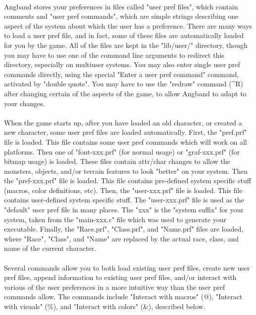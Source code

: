 \paragraph{}Angband stores your preferences in files called "user pref files",
which contain comments and "user pref commands", which are simple strings
describing one aspect of the system about which the user has a preference.
There are many ways to load a user pref file, and in fact, some of these
files are automatically loaded for you by the game. All of the files are
kept in the "lib/user/" directory, though you may have to use one of the
command line arguments to redirect this directory, especially on multiuser
systems. You may also enter single user pref commands directly, using the
special "Enter a user pref command" command, activated by "double quote".
You may have to use the "redraw" command (\^{}R) after changing certain of
the aspects of the game, to allow Angband to adapt to your changes.

\paragraph{}When the game starts up, after you have loaded an old character,
or created a new character, some user pref files are loaded automatically.
First, the "pref.prf" file is loaded. This file contains some user pref
commands which will work on all platforms. Then one of "font-xxx.prf"
(for normal usage) or "graf-xxx.prf" (for bitmap usage) is loaded. These
files contain attr/char changes to allow the monsters, objects, and/or
terrain features to look "better" on your system. Then the "pref-xxx.prf"
file is loaded. This file contains pre-defined system specific stuff
(macros, color definitions, etc). Then, the "user-xxx.prf" file is loaded.
This file contains user-defined system specific stuff. The "user-xxx.prf"
file is used as the "default" user pref file in many places. The "xxx" is
the "system suffix" for your system, taken from the "main-xxx.c" file which
was used to generate your executable. Finally, the "Race.prf", "Class.prf",
and "Name.prf" files are loaded, where "Race", "Class", and "Name" are
replaced by the actual race, class, and name of the current character.

\paragraph{}Several commands allow you to both load existing user pref files,
create new user pref files, append information to existing user pref files,
and/or interact with various of the user preferences in a more intuitive
way than the user pref commands allow. The commands include "Interact with
macros" (@), "Interact with visuals" (\%), and "Interact with colors" (\&),
described below.

